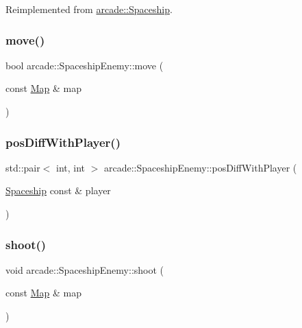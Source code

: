 Reimplemented from \hyperlink{classarcade_1_1_spaceship_aa6a5b59bdb64be086b212847e752b02c}{arcade\+::\+Spaceship}.

\mbox{\label{classarcade_1_1_spaceship_enemy_a62c4ee2725fd8d7496d433bb2ea86603}} 
\subsubsection{\texorpdfstring{move()}{move()}}
{\footnotesize\ttfamily bool arcade\+::\+Spaceship\+Enemy\+::move (\begin{DoxyParamCaption}\item[{const \hyperlink{classarcade_1_1_map}{Map} \&}]{map }\end{DoxyParamCaption})}

\mbox{\label{classarcade_1_1_spaceship_enemy_a6a6b1e32ef2618727bfe01e828a8e4e8}} 
\subsubsection{\texorpdfstring{pos\+Diff\+With\+Player()}{posDiffWithPlayer()}}
{\footnotesize\ttfamily std\+::pair$<$ int, int $>$ arcade\+::\+Spaceship\+Enemy\+::pos\+Diff\+With\+Player (\begin{DoxyParamCaption}\item[{\hyperlink{classarcade_1_1_spaceship}{Spaceship} const \&}]{player }\end{DoxyParamCaption})}

\mbox{\label{classarcade_1_1_spaceship_enemy_ad4963ac1857b42c2497774f77a6d0d05}} 
\subsubsection{\texorpdfstring{shoot()}{shoot()}}
{\footnotesize\ttfamily void arcade\+::\+Spaceship\+Enemy\+::shoot (\begin{DoxyParamCaption}\item[{const \hyperlink{classarcade_1_1_map}{Map} \&}]{map }\end{DoxyParamCaption})}

